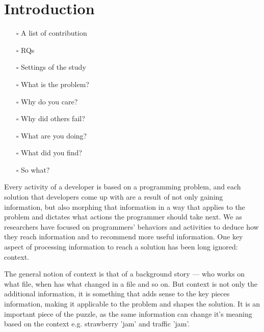 \section{Introduction}


\begin{itemize}
\item[$\square$] A list of contribution
\item[$\square$] RQs
\item[$\square$] Settings of the study
\item[$\square$] What is the problem?
\item[$\square$] Why do you care?
\item[$\square$] Why did others fail?
\item[$\square$] What are you doing?
\item[$\square$] What did you find?
\item[$\square$] So what?
\end{itemize}


Every activity of a developer is based on a programming problem, and each solution that developers come up with are a result of not only gaining information, but also morphing that information in a way that applies to the problem and dictates what actions the programmer should take next. We as researchers have focused on programmers' behaviors and activities to deduce how they reach information and to recommend more useful information. One key aspect of processing information to reach a solution has been long ignored: context. 
 
The general notion of context is that of a background story --- who works on what file, when has what changed in a file and so on. But context is not only the additional information, it is something that adds sense to the key pieces information, making it applicable to the problem and shapes the solution. It is an important piece of the puzzle, as the same information can change it's meaning based on the context e.g. strawberry 'jam' and traffic 'jam'. 

